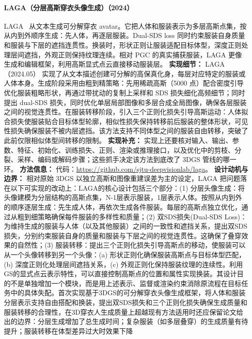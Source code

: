 \paragraph{LAGA（分层高斯穿衣头像生成）（2024）}
LAGA~\cite{2405_12663} 从文本生成可分解穿衣 avatar。它把人体和服装表示为多层高斯点集，按从内到外顺序生成：先人体，再逐层服装。Dual-SDS loss 同时约束服装自身质量和服装与下层的遮挡连贯性。换装时，形状正则让服装适配目标体型，深度正则处理层间遮挡，外观正则保持纹理连续。相对 PGC 的真实捕获服装，LAGA 更像生成和编辑框架，利用高斯显式点云直接移动服装层。
\textbf{实现细节：} LAGA（2024.05） 实现了从文本描述创建可分解的高保真化身，每层对应特定的服装或人体本身。生成阶段采用由粗到精策略：先用稀疏高斯（5000 点）配合密度引导优化服装粗略形状，再通过带扰动的复制上采样和 SDS 损失细化高频细节；同时提出 dual-SDS 损失，同时优化单层局部图像和多层合成全局图像，确保各层服装之间的视觉连贯性。在服装转移阶段，引入三个正则化损失引导高斯运动：人体拟合损失使服装贴合目标体型轮廓，相似性损失保持转移前后服装的整体形状，可见性损失确保服装不被内层遮挡。该方法支持不同体型之间的服装自由转移，突破了此前仅限相似体型间转移的限制。
\textbf{实现补充：} 实现上还要核对输入、输出、参数、特征、初始化、训练损失、正则、渲染或推理接口，以及优化中的剪枝、分裂、采样、编码或解码步骤；这些抓手决定该方法到底改了 3DGS 管线的哪一环。
\textbf{方法信息：} 代码：\url{https://github.com/sjtu-deepvisionlab/laga}。
\textbf{设计动机与边界：} 相对原始 3DGS 以独立高斯和图像重建误差为主的设定，LAGA 把问题落在以下可实现的改动上：LAGA的核心设计包括三个部分：(1) 分层头像生成：将头像建模为分层结构的高斯点集，N-1层表示服装，1层表示人体。按照从内到外的顺序逐层生成：先生成人体，再依次生成各件服装。每层的高斯点独立优化，通过从粗到细策略确保每件服装的多样性和质量；(2) 双SDS损失(Dual-SDS Loss)：为维持生成的服装与人体（以及其他服装）之间的一致性和遮挡关系，提出双SDS损失，分别约束服装自身的质量和服装与下层之间的视觉连贯性。这确保了叠穿效果的自然性；(3) 服装转移：提出三个正则化损失引导高斯点的移动，使服装可以从一个头像转移到另一个头像：(a) 形状正则化确保服装高斯点与目标体型匹配，(b) 深度正则化处理层间遮挡关系，(c) 外观正则化保持服装纹理的连续性。利用GS的显式点云表示特性，可以直接控制高斯点的位置和属性实现换装。其设计目的不是单独增加一个模块，而是用上述表示、监督或渲染约束消除原流程在目标任务中的具体失配。首次实现基于3DGS的可分解穿衣头像生成框架，将人体和服装分层表示支持自由搭配和换装，提出双SDS损失和三个正则化损失确保生成质量和服装转移的合理性，在3D穿衣人生成质量上超越现有方法适用时还应保留论文给出的边界：分层生成增加了总生成时间；复杂服装（如多层叠穿）的生成质量有待提升；服装转移在体型差异过大时效果下降
